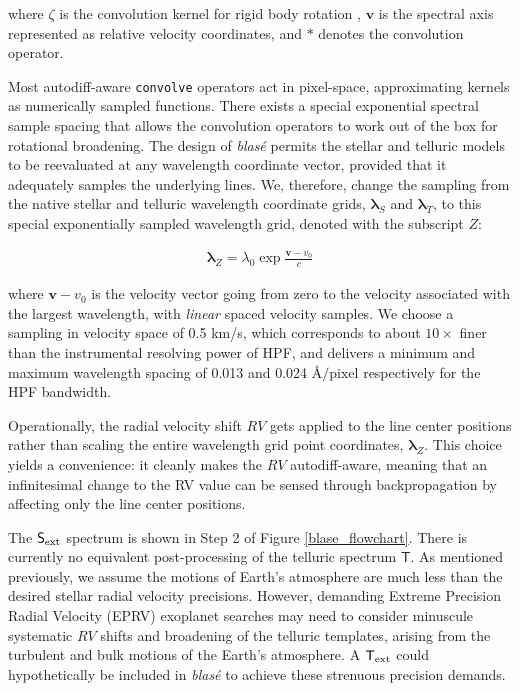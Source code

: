 \documentclass[twocolumn]{aastex631}
\begin{document}
\noindent where $\zeta$ is the convolution kernel for rigid body rotation \citep[\emph{e.g.}][]{2022ApJS..258...31K}, $\bm{v}$ is the spectral axis represented as relative velocity coordinates, and $*$ denotes the convolution operator.

Most autodiff-aware \texttt{convolve} operators act in pixel-space, approximating kernels as numerically sampled functions.  There exists a special exponential spectral sample spacing that allows the convolution operators to work out of the box for rotational broadening.  The design of \emph{blas\'e} permits the stellar and telluric models to be reevaluated at any wavelength coordinate vector, provided that it adequately samples the underlying lines.  We, therefore, change the sampling from the native stellar and telluric wavelength coordinate grids, $\bm{\lambda}_S$ and $\bm{\lambda}_T$, to this special exponentially sampled wavelength grid, denoted with the subscript $Z$:

\begin{eqnarray}
    \bm{\lambda}_Z = \lambda_0  \exp{\frac{\bm{v}-v_0}{c}}
\end{eqnarray}

\noindent where $\bm{v}-v_0$ is the velocity vector going from zero to the velocity associated with the largest wavelength, with \emph{linear} spaced velocity samples.  We choose a sampling in velocity space of 0.5 km/s, which corresponds to about $10\times$ finer than the instrumental resolving power of HPF, and delivers a minimum and maximum wavelength spacing of 0.013 and 0.024 \AA$/\text{pixel}$ respectively for the HPF bandwidth.

Operationally, the radial velocity shift $RV$ gets applied to the line center positions rather than scaling the entire wavelength grid point coordinates, $\bm{\lambda}_Z$. This choice yields a convenience: it cleanly makes the $RV$ autodiff-aware, meaning that an infinitesimal change to the RV value can be sensed through backpropagation by affecting only the line center positions.

The $\mathsf{S}_{\rm ext}$ spectrum is shown in Step 2 of Figure \ref{blase_flowchart}.  There is currently no equivalent post-processing of the telluric spectrum $\mathsf{T}$.  As mentioned previously, we assume the motions of Earth's atmosphere are much less than the desired stellar radial velocity precisions.  However, demanding Extreme Precision Radial Velocity (EPRV) exoplanet searches may need to consider minuscule systematic $RV$ shifts and broadening of the telluric templates, arising from the turbulent and bulk motions of the Earth's atmosphere.  A $\mathsf{T}_{\rm ext}$ could hypothetically be included in  \emph{blas\'e} to achieve these strenuous precision demands.
\end{document}
